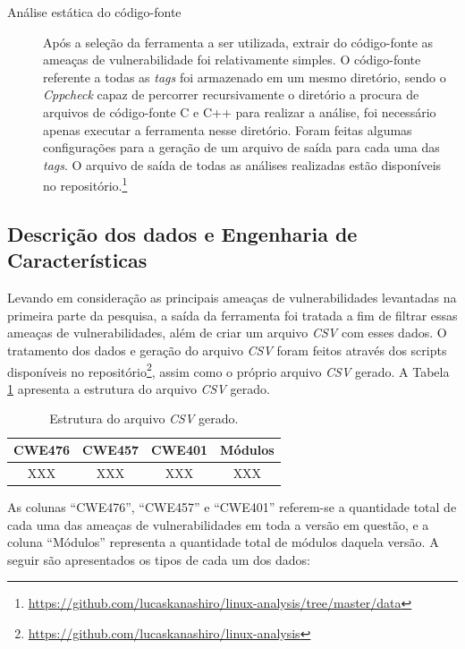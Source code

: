\begin{description}
\item[Análise estática do código-fonte]

Após a seleção da ferramenta a ser utilizada, extrair do código-fonte as
ameaças de vulnerabilidade foi relativamente simples. O código-fonte referente a
todas as \textit{tags} foi armazenado em um mesmo diretório, sendo o
\textit{Cppcheck} capaz de percorrer recursivamente o diretório a procura de
arquivos de código-fonte C e C++ para realizar a análise, foi necessário apenas
executar a ferramenta nesse diretório. Foram feitas algumas configurações para a
geração de um arquivo de saída para cada uma das \textit{tags}. O arquivo de
saída de todas as análises realizadas estão disponíveis no
repositório.\footnote{\url{https://github.com/lucaskanashiro/linux-analysis/tree/master/data}}

\end{description}

\subsection{Descrição dos dados e Engenharia de Características}

Levando em consideração as principais ameaças de vulnerabilidades levantadas na
primeira parte da pesquisa, a saída da ferramenta foi tratada a fim de filtrar
essas ameaças de vulnerabilidades, além de criar um arquivo \textit{CSV} com
esses dados. O tratamento dos dados e geração do arquivo \textit{CSV} foram
feitos através dos scripts disponíveis no
repositório\footnote{\url{https://github.com/lucaskanashiro/linux-analysis}},
assim como o próprio arquivo \textit{CSV} gerado. A Tabela \ref{tab:csv}
apresenta a estrutura do arquivo \textit{CSV} gerado.

\begin{table}[h]
\centering
\begin{tabular}{cccc}
\hline
\rowcolor[HTML]{EFEFEF} 
{\textbf CWE476} & {\textbf CWE457} & {\textbf CWE401} &
{\textbf Módulos} \\ \hline
XXX          & XXX          & XXX          & XXX     \\ \hline
\end{tabular}
\caption{Estrutura do arquivo \textit{CSV} gerado.}
\label{tab:csv}
\end{table}

As colunas ``CWE476'', ``CWE457'' e ``CWE401'' referem-se a quantidade total de
cada uma das ameaças de vulnerabilidades em toda a versão em questão, e a coluna
``Módulos'' representa a quantidade total de módulos daquela versão. A seguir
são apresentados os tipos de cada um dos dados:

